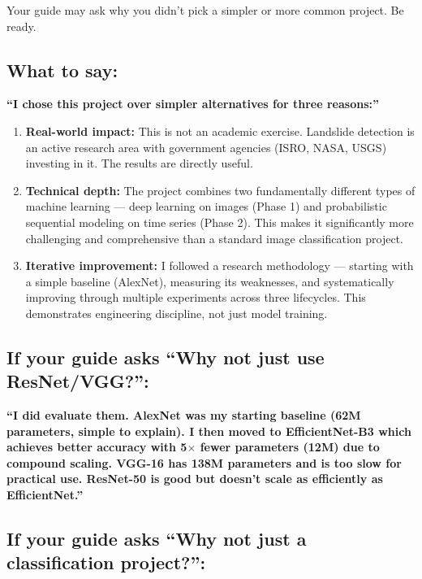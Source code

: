 \documentclass[11pt]{article}
\begin{document}
Your guide may ask why you didn't pick a simpler or more common project. Be ready.

\subsection{What to say:}

\textbf{``I chose this project over simpler alternatives for three reasons:''}

\begin{enumerate}
    \item \textbf{Real-world impact:} This is not an academic exercise. Landslide detection is an active research area with government agencies (ISRO, NASA, USGS) investing in it. The results are directly useful.

    \item \textbf{Technical depth:} The project combines two fundamentally different types of machine learning --- deep learning on images (Phase 1) and probabilistic sequential modeling on time series (Phase 2). This makes it significantly more challenging and comprehensive than a standard image classification project.

    \item \textbf{Iterative improvement:} I followed a research methodology --- starting with a simple baseline (AlexNet), measuring its weaknesses, and systematically improving through multiple experiments across three lifecycles. This demonstrates engineering discipline, not just model training.
\end{enumerate}

\subsection{If your guide asks ``Why not just use ResNet/VGG?'':}

\textbf{``I did evaluate them. AlexNet was my starting baseline (62M parameters, simple to explain). I then moved to EfficientNet-B3 which achieves better accuracy with 5$\times$ fewer parameters (12M) due to compound scaling. VGG-16 has 138M parameters and is too slow for practical use. ResNet-50 is good but doesn't scale as efficiently as EfficientNet.''}

\subsection{If your guide asks ``Why not just a classification project?'':}
\end{document}
